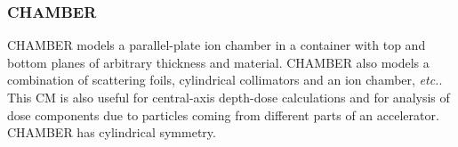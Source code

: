 \documentclass[12pt,twoside]{article}
\newcommand{\etc}{{\em etc.}}
\begin{document}

\subsubsection{CHAMBER}
\label{chamber_cm}
\renewcommand{\rightmark}{CHAMBER CM}

CHAMBER models a parallel-plate ion chamber in a container with top and bottom
planes of arbitrary thickness and material. CHAMBER also
models a combination of scattering foils, cylindrical
collimators and an ion chamber, \etc. This CM is also useful for
central-axis
depth-dose calculations and for analysis of dose components due to
particles coming from different parts of an accelerator.
CHAMBER has cylindrical symmetry.
\end{document}
